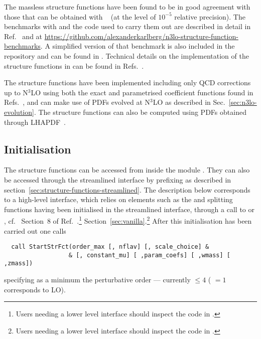 The massless structure functions have been found to be in good
agreement with those that can be obtained with
\APFELPP{}~\cite{Bertone:2013vaa,Bertone:2017gds} (at the level of
$10^{-5}$ relative precision).
%
The benchmarks with \APFELPP{} and the code used to carry them out are
described in detail in Ref.~\cite{Bertone:2024dpm} and at
\url{https://github.com/alexanderkarlberg/n3lo-structure-function-benchmarks}. A
simplified version of that benchmark is also included in the \hoppet{}
repository and can be found in
.
%
Technical details on the implementation of the structure functions in
\hoppet can be found in
Refs.~\cite{Dreyer:2016vbc,Karlberg:2016zik,Bertone:2024dpm}.

The structure functions have been implemented including only QCD
corrections up to N$^3$LO using both the exact and parametrised
coefficient functions found in
Refs.~\cite{vanNeerven:1999ca,vanNeerven:2000uj,Moch:2004xu,Vermaseren:2005qc,Moch:2008fj,Davies:2016ruz,Blumlein:2022gpp},
and can make use of PDFs evolved at N$^3$LO as described in
Sec.~\ref{sec:n3lo-evolution}. The structure functions can also be
computed using PDFs obtained through LHAPDF~\cite{LHAPDF}.

\subsection{Initialisation}
\label{sec:structure-funcs-init}

The structure functions can be accessed from inside the module
. They can also be accessed through the
streamlined interface by prefixing  as described in
section~\ref{sec:structure-functions-streamlined}.
%
The description below corresponds to a high-level interface, which
relies on elements such as the  and splitting functions
having been initialised in the streamlined interface, through a call
to  or , cf.\
\ifreleasenote
Section~8 of Ref.~\cite{Salam:2008qg}.\footnote{Users needing a lower level
  interface should inspect the code in .}
\else
Section~\ref{sec:vanilla}.\footnote{Users needing a lower level
  interface should inspect the code in .}
\fi
%
After this initialisation has been carried out one calls
\begin{lstlisting}
  call StartStrFct(order_max [, nflav] [, scale_choice] &
                  & [, constant_mu] [ ,param_coefs] [ ,wmass] [ ,zmass])
\end{lstlisting}
specifying as a minimum the perturbative order --- currently
 $ \le 4$ (\ttt{order\_max} $ =1$ corresponds to LO).

